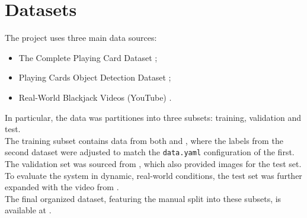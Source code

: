 \section{Datasets}
The project uses three main data sources:
\begin{itemize}
    \item The Complete Playing Card Dataset \cite{shah_kaggle};
    \item Playing Cards Object Detection Dataset \cite{andy8744_kaggle};
    \item Real-World Blackjack Videos (YouTube) \cite{bluff_blackjack}.
\end{itemize}
In particular, the data was partitiones into three subsets: training, validation and test. \\
The training subset contains data from both \cite{shah_kaggle} and \cite{andy8744_kaggle}, where 
the labels from the second dataset were adjusted to match the \texttt{data.yaml} configuration of the first.
The validation set was sourced from \cite{andy8744_kaggle}, which also provided images for the test set. 
To evaluate the system in dynamic, real-world conditions, the test set was further expanded with the video 
from \cite{bluff_blackjack}. \\
The final organized dataset, featuring the manual split into these subsets, is available at \cite{annunziata_kaggle}.